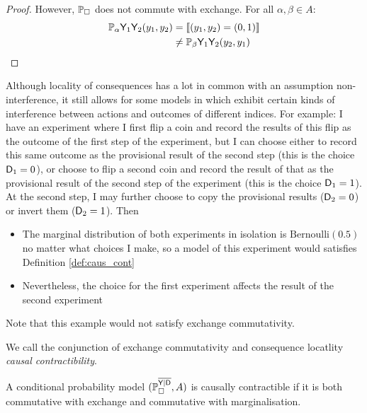 \begin{proof}
However, $\mathbb{P}_\square$ does not commute with exchange. For all $\alpha,\beta \in A$:
\begin{align}
    \mathbb{P}_\alpha{\ensuremath{\mathsf{Y}}_1\ensuremath{\mathsf{Y}}_2}(y_1,y_2) &= \llbracket (y_1,y_2)= (0,1) \rrbracket\\
    &\neq \mathbb{P}_\beta{\ensuremath{\mathsf{Y}}_1\ensuremath{\mathsf{Y}}_2}(y_2,y_1)
\end{align}
\end{proof}

Although locality of consequences has a lot in common with an assumption non-interference, it still allows for some models in which exhibit certain kinds of interference between actions and outcomes of different indices. For example: I have an experiment where I first flip a coin and record the results of this flip as the outcome of the first step of the experiment, but I can choose either to record this same outcome as the provisional result of the second step (this is the choice $\mathsf{D}_1=0$), or choose to flip a second coin and record the result of that as the provisional result of the second step of the experiment (this is the choice $\mathsf{D}_1=1$). At the second step, I may further choose to copy the provisional results ($\mathsf{D}_2=0$) or invert them ($\mathsf{D}_2=1$). Then
\begin{itemize}
    \item The marginal distribution of both experiments in isolation is $\text{Bernoulli}(0.5)$ no matter what choices I make, so a model of this experiment would satisfies Definition \ref{def:caus_cont}
    \item Nevertheless, the choice for the first experiment affects the result of the second experiment
\end{itemize}

Note that this example would not satisfy exchange commutativity.

We call the conjunction of exchange commutativity and consequence locatlity \emph{causal contractibility}.

\begin{definition}
A conditional probability model $(\mathbb{P}_{\square}^{\overline{\mathsf{Y}|\mathsf{D}}},A)$ is causally contractible if it is both commutative with exchange and commutative with marginalisation.
\end{definition}


